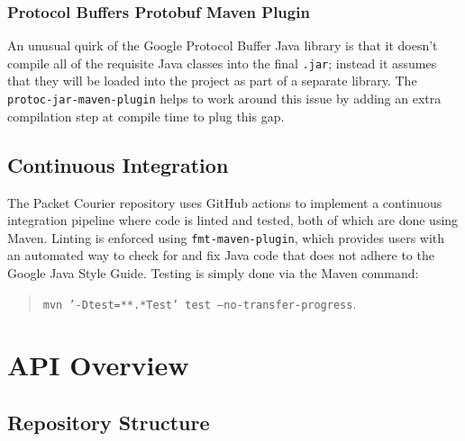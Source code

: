 \subsubsection{Protocol Buffers Protobuf Maven Plugin}\label{subsubsection:protocol_buffers_protobuf_maven_plugin}

An unusual quirk of the Google Protocol Buffer Java library is that it doesn't compile all of the requisite Java
classes into the final \texttt{.jar}; instead it assumes that they will be loaded into the project as part of a
separate library. The \texttt{protoc-jar-maven-plugin}\cite{protoc_jar_maven_plugin} helps to work around this issue
by adding an extra compilation step at compile time to plug this gap.

\subsection{Continuous Integration}\label{subsection:continuous_integration}

The Packet Courier repository uses GitHub actions\cite{github_actions} to implement a continuous integration
pipeline\cite{aws_ci} where code is linted and tested, both of which are done using Maven. Linting is enforced using
\texttt{fmt-maven-plugin}\cite{fmt_maven_plugin}, which provides users with an automated way to check for and fix Java
code that does not adhere to the Google Java Style Guide\cite{google_java_format, google_java_style_guide}. Testing
is simply done via the Maven command:
\begin{quote}
    \texttt{mvn '-Dtest=**.*Test' test --no-transfer-progress}.
\end{quote}


\newpage


\section{API Overview}\label{section:api_overview}

\subsection{Repository Structure}\label{subsection:repository_structure}

